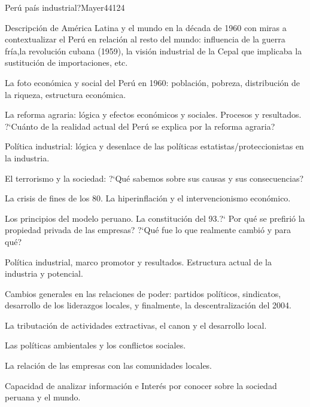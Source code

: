 \begin{syllabus}
\begin{unit}{Perú país industrial?}{}{Mayer44}{12}{4}
   \begin{topics}
      \item Descripción de América Latina y el mundo en la década de 1960 con miras a contextualizar el Perú en relación al resto del mundo: influencia de la guerra fría,la revolución cubana (1959), la visión industrial de la Cepal que implicaba la sustitución de importaciones, etc.
      \item La foto económica y social del Perú en 1960: población, pobreza, distribución de la riqueza, estructura económica.
      \item La reforma agraria: lógica y efectos económicos y sociales. Procesos y resultados. ?`Cuánto de la realidad actual del Perú se explica por la reforma agraria?
      \item Política industrial: lógica y desenlace de las políticas estatistas/proteccionistas en la industria.
      \item El terrorismo y la sociedad: ?`Qué sabemos sobre sus causas y sus consecuencias?
      \item La crisis de fines de los 80. La hiperinflación y el intervencionismo económico.
      \item Los principios del modelo peruano. La constitución del 93.?` Por qué se prefirió la propiedad privada de las empresas? ?`Qué fue lo que realmente cambió y para qué?
      \item Política industrial, marco promotor y resultados. Estructura actual de la industria y potencial.
      \item Cambios generales en las relaciones de poder: partidos políticos, sindicatos, desarrollo de los liderazgos locales, y finalmente, la descentralización del 2004.
      \item La tributación de actividades extractivas, el canon y el desarrollo local.
      \item Las políticas ambientales y los conflictos sociales.
      \item La relación de las empresas con las comunidades locales.
   \end{topics}
   \begin{learningoutcomes}
      \item Capacidad de analizar información e Interés por conocer sobre la sociedad peruana y el mundo.
   \end{learningoutcomes}
\end{unit}



\begin{coursebibliography}
\end{coursebibliography}

\end{syllabus}
